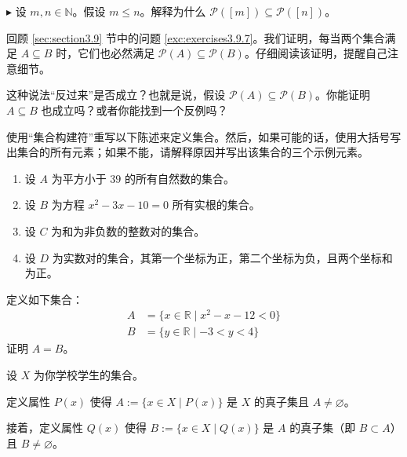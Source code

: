 \begin{exercise}
    $\blacktriangleright$ 设 $m, n \in \mathbb{N}$。假设 $m \le n$。解释为什么 $\mathcal{P}([m]) \subseteq \mathcal{P}([n])$。
\end{exercise}

\begin{exercise}
    回顾 \ref{sec:section3.9} 节中的问题 \ref{exc:exercises3.9.7}。我们证明，每当两个集合满足 $A \subseteq B$ 时，它们也必然满足 $\mathcal{P}(A) \subseteq \mathcal{P}(B)$。仔细阅读该证明，提醒自己注意细节。

    这种说法``反过来''是否成立？也就是说，假设 $\mathcal{P}(A) \subseteq \mathcal{P}(B)$。你能证明 $A \subseteq B$ 也成立吗？或者你能找到一个反例吗？
\end{exercise}

\begin{exercise}
    使用``集合构建符''重写以下陈述来定义集合。然后，如果可能的话，使用大括号写出集合的所有元素；如果不能，请解释原因并写出该集合的三个示例元素。
    \begin{enumerate}[label=(\alph*)]
        \item 设 $A$ 为平方小于 $39$ 的所有自然数的集合。
        \item 设 $B$ 为方程 $x^2 - 3x - 10 = 0$ 所有实根的集合。
        \item 设 $C$ 为和为非负数的整数对的集合。
        \item 设 $D$ 为实数对的集合，其第一个坐标为正，第二个坐标为负，且两个坐标和为正。
    \end{enumerate}
\end{exercise}

\begin{exercise}
    定义如下集合：
    \begin{align*}
        A &= \{x \in \mathbb{R} \mid x^2 - x - 12 < 0 \} \\
        B &= \{y \in \mathbb{R} \mid -3 < y < 4\}
    \end{align*}
    证明 $A = B$。
\end{exercise}

\begin{exercise}
    设 $X$ 为你学校学生的集合。

    定义属性 $P(x)$ 使得 $A := \{x \in X \mid P(x)\}$ 是 $X$ 的真子集且 $A \ne \varnothing$。

    接着，定义属性 $Q(x)$ 使得 $B := \{x \in X \mid Q(x)\}$ 是 $A$ 的真子集（即 $B \subset A$）且 $B \ne \varnothing$。
\end{exercise}

